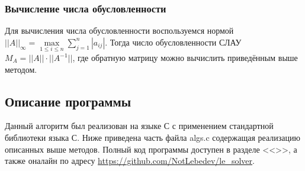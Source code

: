 \documentclass[a4paper,12pt,titlepage,finall]{article}
\begin{document}
\subsubsection{Вычисление числа обусловленности}
Для вычисления числа обусловленности воспользуемся нормой $||A||_{\infty } = \max\limits_{1 \leq i \leq n} \sum\limits_{j=1}^n |a_{ij}|$. Тогда число обусловленности СЛАУ $M_A=||A|| \cdot ||A^{-1}||$, где обратную матрицу можно вычислить приведённым выше методом.
\subsection{Описание программы}
Данный алгоритм был реализован на языке С с применением стандартной библиотеки языка С. Ниже приведена часть файла algs.c содержащая реализацию описанных выше методов. Полный код программы доступен в разделе <<>>, а также оналайн по адресу \url{https://github.com/NotLebedev/le_solver}.

\end{document}
